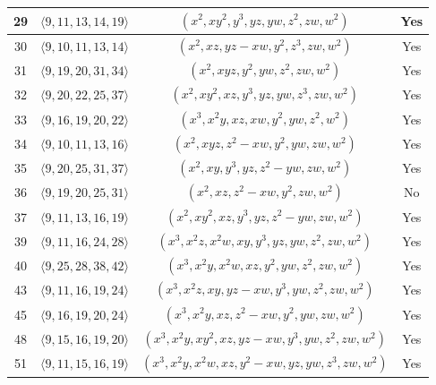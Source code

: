 \documentclass{amsart}
\theoremstyle{plain}
\theoremstyle{definition}
\numberwithin{theorem}{section}
\numberwithin{equation}{section}
\numberwithin{equation}{theorem}
\begin{document}
\begin{longtable}{|c|c|c|c|}
\hline
29 & $\langle 9,11, 13, 14, 19\rangle$ & $(x^2, xy^2, y^3, yz, yw, z^2, zw, w^2)$ & Yes\\

\hline
30 & $\langle 9,10, 11, 13, 14\rangle$ & $(x^2, xz,yz-xw, y^2, z^3, zw, w^2)$ & Yes\\

\hline
31 & $\langle 9,19,20, 31, 34\rangle$ & $(x^2, xyz, y^2, yw, z^2, zw, w^2)$ & Yes\\

\hline
32 & $\langle 9,20,22,25, 37\rangle$ & $(x^2, xy^2, xz, y^3, yz, yw, z^3, zw, w^2)$ & Yes\\

\hline
33 & $\langle 9,16,19,20, 22\rangle$ & $(x^3, x^2y, xz, xw, y^2, yw, z^2, w^2)$ & Yes\\

\hline
34 & $\langle 9,10,11,13,16\rangle$ & $(x^2, xyz, z^2-xw, y^2, yw, zw, w^2)$ & Yes\\

\hline
35 & $\langle 9,20,25,31,37\rangle$ & $(x^2, xy, y^3, yz, z^2-yw, zw, w^2)$ & Yes\\

\hline
36 & $\langle 9,19,20,25,31\rangle$ & $(x^2, xz, z^2-xw, y^2, zw, w^2)$ & No\\

\hline
37 & $\langle 9,11,13,16,19\rangle$ & $(x^2, xy^2, xz, y^3, yz, z^2-yw, zw, w^2)$ & Yes\\

\hline
39 & $\langle 9,11,16,24,28\rangle$ & $(x^3, x^2z, x^2w, xy, y^3, yz, yw, z^2, zw, w^2)$ & Yes \\

\hline
40 & $\langle 9,25,28,38,42\rangle$ & $(x^3, x^2y, x^2w, xz, y^2, yw, z^2, zw, w^2)$ & Yes \\

\hline
43 & $\langle 9,11,16,19,24\rangle$ & $(x^3, x^2z, xy, yz-xw, y^3, yw, z^2, zw, w^2)$ & Yes\\

\hline
45 & $\langle 9,16,19,20,24\rangle$ & $(x^3, x^2y, xz, z^2-xw, y^2, yw, zw, w^2)$ & Yes\\

\hline
48 & $\langle 9,15,16,19,20\rangle$ & $(x^3, x^2y, xy^2, xz, yz-xw, y^3, yw, z^2, zw, w^2)$ & Yes\\

\hline
51 & $\langle 9,11,15,16,19\rangle$ & $(x^3, x^2y, x^2w, xz, y^2-xw, yz, yw, z^3, zw, w^2)$ & Yes\\


\end{longtable}
\end{document}
